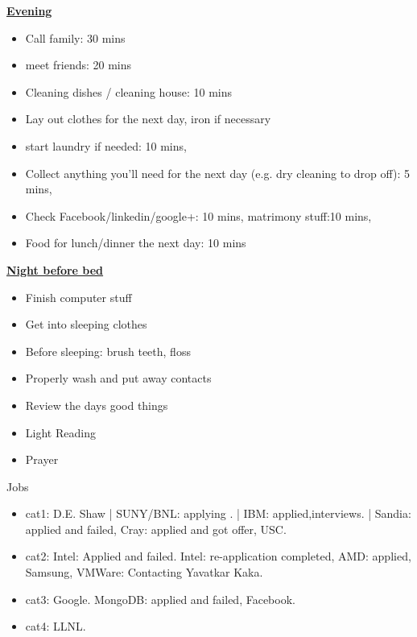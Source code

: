 \underline{\bf Evening}
\begin{itemize}
\tiny \item \tiny Call family: 30 mins
\item \tiny meet friends: 20 mins
\item \tiny Cleaning dishes / cleaning house: 10 mins
\item \tiny Lay out clothes for the next day, iron if necessary
\item \tiny start laundry if needed: 10 mins,
\item \tiny Collect anything you’ll need for the next day (e.g. dry
cleaning to drop off): 5 mins,
\item \tiny Check Facebook/linkedin/google+: 10 mins, matrimony stuff:10 mins,
\item \tiny Food for lunch/dinner the next day: 10 mins
\end{itemize}
\underline{\bf Night before bed}
\begin{itemize}
\tiny \item \tiny Finish computer stuff 
\item \tiny Get into sleeping clothes 
\item \tiny Before sleeping: brush teeth, floss  
\item \tiny Properly wash and put away contacts 
\item \tiny Review the days good things  
\item \tiny Light Reading 
\item \tiny Prayer 
\end{itemize}
\begin{block}{Jobs}
  \begin{itemize}
    \tiny \item \tiny cat1: D.E. Shaw | SUNY/BNL: applying . | IBM:
    applied,interviews.  | Sandia: applied and failed, Cray: applied and got offer, USC. 
  \item \tiny cat2: Intel: Applied and failed. Intel: re-application  completed, AMD: applied, Samsung, VMWare: Contacting Yavatkar Kaka. 
  \item \tiny cat3: Google. MongoDB: applied and failed, Facebook. 
  \item \tiny cat4: LLNL. 
  \end{itemize} 
\end{block} 

